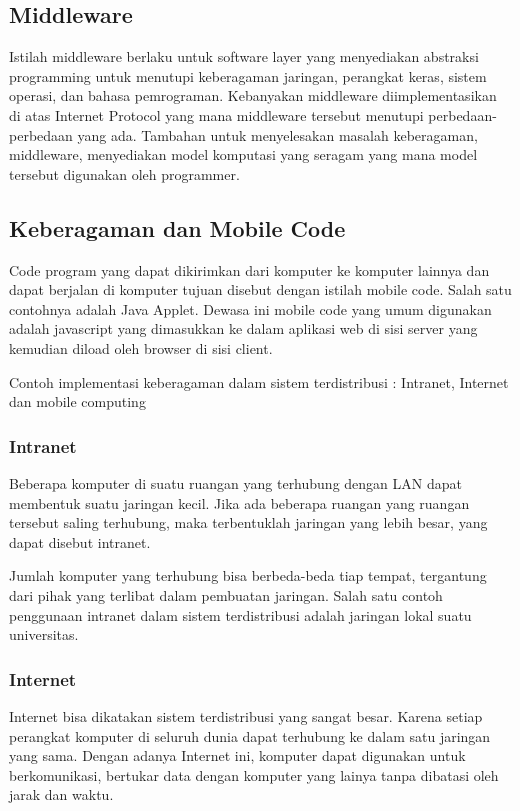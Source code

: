 \documentclass[12pt,a4paper]{apa}
\begin{document}
	\subsection{Middleware}
	Istilah middleware berlaku untuk software layer yang menyediakan abstraksi programming untuk menutupi keberagaman jaringan, perangkat keras, sistem operasi, dan bahasa pemrograman. Kebanyakan middleware diimplementasikan di atas Internet Protocol yang mana middleware tersebut menutupi perbedaan-perbedaan yang ada. Tambahan untuk menyelesakan masalah keberagaman, middleware, menyediakan model komputasi yang seragam yang mana model tersebut digunakan oleh programmer. \cite{Coulouris2012}
	\subsection{Keberagaman dan Mobile Code}
	Code program yang dapat dikirimkan dari komputer ke komputer lainnya dan dapat berjalan di komputer tujuan disebut dengan istilah mobile code. Salah satu contohnya adalah Java Applet. Dewasa ini mobile code yang umum digunakan adalah javascript yang dimasukkan ke dalam aplikasi web di sisi server yang kemudian diload oleh browser di sisi client. \cite{Coulouris2012}
	
	Contoh implementasi keberagaman dalam sistem terdistribusi : Intranet, Internet dan mobile computing \cite{Kamalapur2008}
	\subsubsection{Intranet}
		Beberapa komputer di suatu ruangan yang terhubung dengan LAN dapat membentuk suatu jaringan kecil. Jika ada beberapa ruangan yang ruangan tersebut saling terhubung, maka terbentuklah jaringan yang lebih besar, yang dapat disebut intranet.
		
		Jumlah komputer yang terhubung bisa berbeda-beda tiap tempat, tergantung dari pihak yang terlibat dalam pembuatan jaringan. Salah satu contoh penggunaan intranet dalam sistem terdistribusi adalah jaringan lokal suatu universitas.
		
	\subsubsection{Internet}
		
		Internet bisa dikatakan sistem terdistribusi yang sangat besar. Karena setiap perangkat komputer di seluruh dunia dapat terhubung ke dalam satu jaringan yang sama. Dengan adanya Internet ini, komputer dapat digunakan untuk berkomunikasi, bertukar data dengan komputer yang lainya tanpa dibatasi oleh jarak dan waktu.
		
\end{document}
